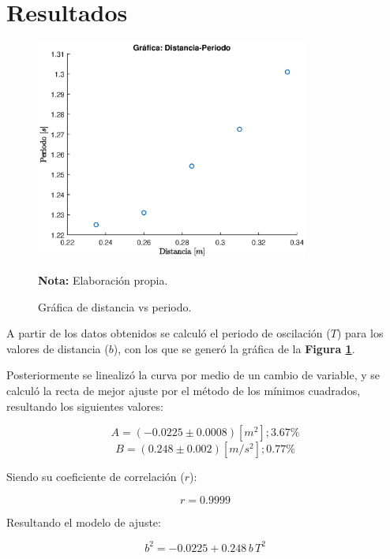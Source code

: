 \documentclass[letter,11pt]{article}
\newcommand{\source}[1]{\vspace{-11pt} \caption*{\small{\textbf{Nota:} {#1}}}}
\begin{document}
\section{Resultados}

\begin{figure}
\centering
\includegraphics[width=0.80\textwidth]{resources/m1.1.eps}
\caption{Gráfica de distancia vs periodo.}
\label{figura5}
\source{Elaboración propia.}
\end{figure}

A partir de los datos obtenidos se calculó el periodo de oscilación ($T$) para
los valores de distancia ($b$), con los que se generó la gráfica de la
\textbf{Figura \ref{figura5}}.

Posteriormente se linealizó la curva por medio de un cambio de variable, y se
calculó la recta de mejor ajuste por el método de los mínimos cuadrados,
resultando los siguientes valores:

\begin{equation*}
    A = (-0.0225 \pm 0.0008) [m^2]; 3.67\%
\end{equation*}
\begin{equation*}
    B = (0.248 \pm 0.002) [m/s^2]; 0.77\%
\end{equation*}
\vspace{0.10cm}

Siendo su coeficiente de correlación ($r$):

\begin{equation*}
    r = 0.9999
\end{equation*}
\vspace{0.10cm}

Resultando el modelo de ajuste:

\begin{equation*}
    b^2 = -0.0225 + 0.248\,b\,T^2
\end{equation*}
\vspace{0.10cm}
\end{document}
